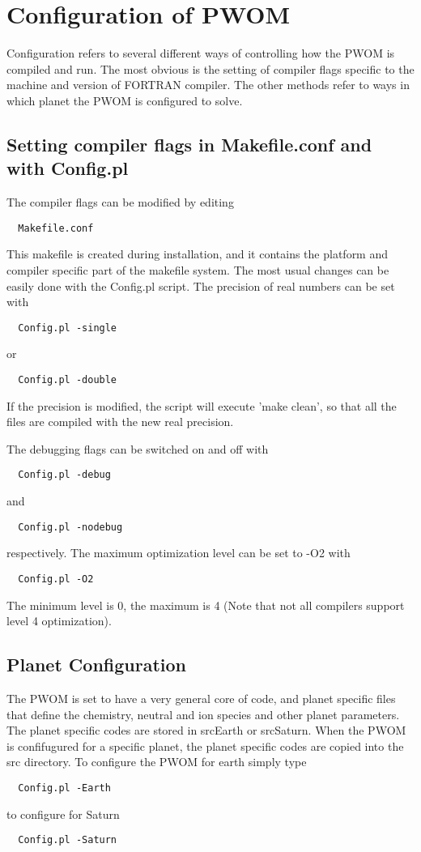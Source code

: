 \section{Configuration of PWOM}

Configuration refers to several different ways of controlling how the 
PWOM is compiled and run.  The most obvious is the setting of
compiler flags specific to the machine and version of FORTRAN
compiler.  The other methods refer to ways in which planet the PWOM 
is configured to solve.

\subsection{Setting compiler flags in Makefile.conf and with Config.pl}

The compiler flags can be modified by editing
\begin{verbatim}
  Makefile.conf
\end{verbatim}
This makefile is created during installation, and it contains the
platform and compiler specific part of the makefile system.
The most usual changes can be easily done with the Config.pl script.
The precision of real numbers can be set with
\begin{verbatim}
  Config.pl -single
\end{verbatim}
or 
\begin{verbatim}
  Config.pl -double
\end{verbatim}
If the precision is modified, the script will execute 'make clean',
so that all the files are compiled with the new real precision.

The debugging flags can be switched on and off with
\begin{verbatim}
  Config.pl -debug
\end{verbatim}
and
\begin{verbatim}
  Config.pl -nodebug
\end{verbatim}
respectively. The maximum optimization level can be set to -O2 with
\begin{verbatim}
  Config.pl -O2
\end{verbatim}
The minimum level is 0, the maximum is 4 (Note that not all compilers support
level 4 optimization).

\subsection{Planet Configuration}

The PWOM is set to have a very general core of code, and planet specific 
files that define the chemistry, neutral and ion species and other 
planet parameters. The planet specific codes are stored in srcEarth or 
srcSaturn. When the PWOM is confifugured for a specific planet, the planet 
specific codes are copied into the src directory. To configure the PWOM for 
earth simply type
\begin{verbatim}
  Config.pl -Earth
\end{verbatim}
to configure for Saturn
\begin{verbatim}
  Config.pl -Saturn
\end{verbatim}


